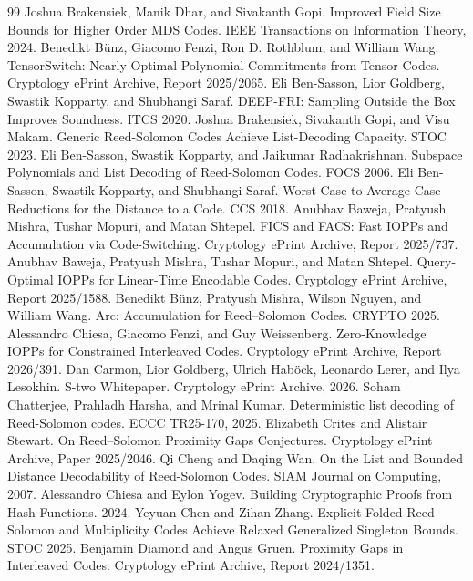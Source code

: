\documentclass[11pt]{article}
\theoremstyle{plain}
\theoremstyle{definition}
\begin{document}
\begin{thebibliography}{99}
 Joshua Brakensiek, Manik Dhar, and Sivakanth Gopi. Improved Field Size Bounds for Higher Order MDS Codes. IEEE Transactions on Information Theory, 2024.
 Benedikt B\"unz, Giacomo Fenzi, Ron D. Rothblum, and William Wang. TensorSwitch: Nearly Optimal Polynomial Commitments from Tensor Codes. Cryptology ePrint Archive, Report 2025/2065.
 Eli Ben-Sasson, Lior Goldberg, Swastik Kopparty, and Shubhangi Saraf. DEEP-FRI: Sampling Outside the Box Improves Soundness. ITCS 2020.
 Joshua Brakensiek, Sivakanth Gopi, and Visu Makam. Generic Reed-Solomon Codes Achieve List-Decoding Capacity. STOC 2023.
 Eli Ben-Sasson, Swastik Kopparty, and Jaikumar Radhakrishnan. Subspace Polynomials and List Decoding of Reed-Solomon Codes. FOCS 2006.
 Eli Ben-Sasson, Swastik Kopparty, and Shubhangi Saraf. Worst-Case to Average Case Reductions for the Distance to a Code. CCS 2018.
 Anubhav Baweja, Pratyush Mishra, Tushar Mopuri, and Matan Shtepel. FICS and FACS: Fast IOPPs and Accumulation via Code-Switching. Cryptology ePrint Archive, Report 2025/737.
 Anubhav Baweja, Pratyush Mishra, Tushar Mopuri, and Matan Shtepel. Query-Optimal IOPPs for Linear-Time Encodable Codes. Cryptology ePrint Archive, Report 2025/1588.
 Benedikt B\"unz, Pratyush Mishra, Wilson Nguyen, and William Wang. Arc: Accumulation for Reed--Solomon Codes. CRYPTO 2025.
 Alessandro Chiesa, Giacomo Fenzi, and Guy Weissenberg. Zero-Knowledge IOPPs for Constrained Interleaved Codes. Cryptology ePrint Archive, Report 2026/391.
 Dan Carmon, Lior Goldberg, Ulrich Hab\"ock, Leonardo Lerer, and Ilya Lesokhin. S-two Whitepaper. Cryptology ePrint Archive, 2026.
 Soham Chatterjee, Prahladh Harsha, and Mrinal Kumar. Deterministic list decoding of Reed-Solomon codes. ECCC TR25-170, 2025.
 Elizabeth Crites and Alistair Stewart. On Reed--Solomon Proximity Gaps Conjectures. Cryptology ePrint Archive, Paper 2025/2046.
 Qi Cheng and Daqing Wan. On the List and Bounded Distance Decodability of Reed-Solomon Codes. SIAM Journal on Computing, 2007.
 Alessandro Chiesa and Eylon Yogev. Building Cryptographic Proofs from Hash Functions. 2024.
 Yeyuan Chen and Zihan Zhang. Explicit Folded Reed-Solomon and Multiplicity Codes Achieve Relaxed Generalized Singleton Bounds. STOC 2025.
 Benjamin Diamond and Angus Gruen. Proximity Gaps in Interleaved Codes. Cryptology ePrint Archive, Report 2024/1351.

\end{thebibliography}
\end{document}
